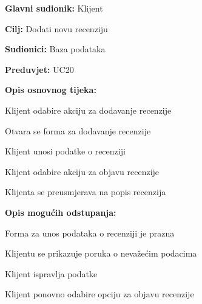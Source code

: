 \pagebreak
\noindent {}
\begin{packed_item}
	
	\item \textbf{Glavni sudionik:} Klijent
	\item  \textbf{Cilj:} Dodati novu recenziju
	\item  \textbf{Sudionici:} Baza podataka
	\item  \textbf{Preduvjet:} UC20
	\item  \textbf{Opis osnovnog tijeka:}
	
	\item[] \begin{packed_enum}
		
        \item Klijent odabire akciju za dodavanje recenzije
        \item Otvara se forma za dodavanje recenzije
        \item Klijent unosi podatke o recenziji
        \item Klijent odabire akciju za objavu recenzije
        \item Klijenta se preusmjerava na popis recenzija
	
	\end{packed_enum}
	\item  \textbf{Opis mogućih odstupanja:}
	
	\item[] \begin{packed_item}
		
		\item[4.a] Forma za unos podataka o recenziji je prazna
		\item[] \begin{packed_enum}
			
			\item Klijentu se prikazuje poruka o nevažećim podacima
			\item Klijent ispravlja podatke
			\item Klijent ponovno odabire opciju za objavu recenzije
			
		\end{packed_enum}
		
	\end{packed_item}
\end{packed_item}


